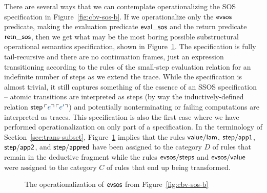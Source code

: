 There are several ways that we can contemplate operationalizing the
SOS specification in Figure~\ref{fig:cbv-sos-b}. If we operationalize
only the ${\sf evsos}$ predicate, making the evaluation predicate
${\sf eval\_sos}$ and the return predicate ${\sf retn\_sos}$, then we
get what may be the most boring possible substructural
operational semantics specification, shown in
Figure~\ref{fig:sos-tailrecursion}. The specification is fully
tail-recursive and there are no continuation frames, just an
expression transitioning according to the rules of the small-step
evaluation relation for an indefinite number of steps as we extend the
trace. While the specification is almost trivial, it still captures
something of the essence of an SSOS specification -- atomic transitions are
interpreted as steps (by way the inductively-defined relation ${\sf
  step}\,\interp{e}\,\interp{e'}$) and potentially
nonterminating or failing
computations are
interpreted as traces. This specification is also the first case where
we have performed operationalization on only part of a specification.
In the terminology of Section~\ref{sec:trans-subset},
Figure~\ref{fig:sos-tailrecursion} implies that the rules ${\sf
  value/lam}$, ${\sf step/app1}$, ${\sf step/app2}$, and ${\sf
  step/appred}$ have been assigned to the category $D$ of rules that
remain in the deductive fragment while the rules ${\sf evsos/steps}$
and ${\sf evsos/value}$ were assigned to the category $C$ of rules
that end up being transformed.


\begin{figure}[tp]
\begin{minipage}[b]{0.9\linewidth}
\end{minipage}
\caption{The operationalization of ${\sf evsos}$ from
  Figure~\ref{fig:cbv-sos-b}}
\label{fig:sos-tailrecursion}
\end{figure}


